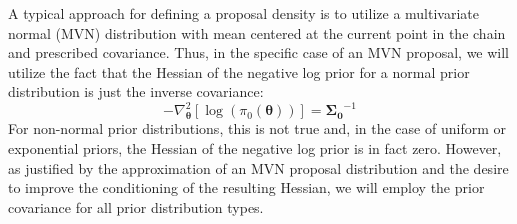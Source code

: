 A typical approach for defining a proposal density is to utilize a
multivariate normal (MVN) distribution with mean centered at the current
point in the chain and prescribed covariance.  Thus, in the specific case
of an MVN proposal, we will utilize the fact that the Hessian of the
negative log prior for a normal prior distribution is just the inverse 
covariance:
\begin{equation}
-\nabla^2_{\boldsymbol{\theta}} \left[ \log(\pi_0(\boldsymbol{\theta})) \right] 
= \boldsymbol{\Sigma_0}^{-1} 
\label{eq:normal_prior_hess}
\end{equation}
For non-normal prior distributions, this is not true and, in the case
of uniform or exponential priors, the Hessian of the negative log
prior is in fact zero.  However, as justified by the approximation of
an MVN proposal distribution and the desire to improve the
conditioning of the resulting Hessian, we will employ the prior
covariance for all prior distribution types.

